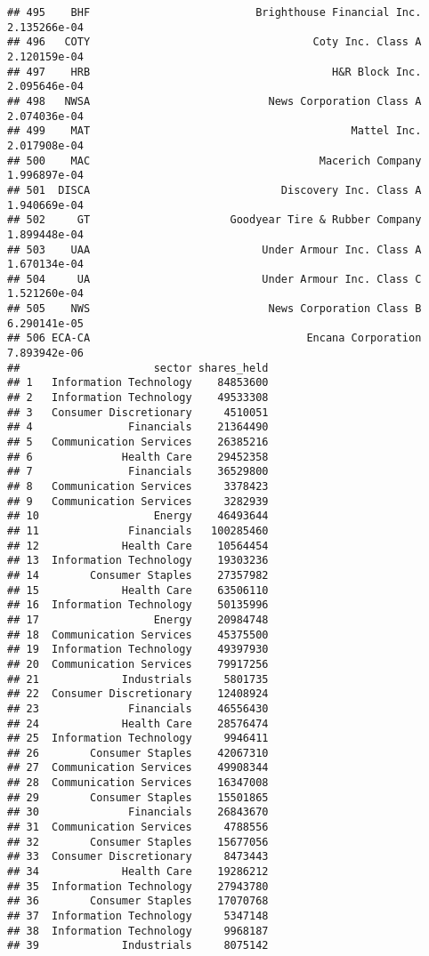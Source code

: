 \documentclass[
]{article}
\begin{document}
\begin{verbatim}
## 495    BHF                          Brighthouse Financial Inc. 2.135266e-04
## 496   COTY                                   Coty Inc. Class A 2.120159e-04
## 497    HRB                                      H&R Block Inc. 2.095646e-04
## 498   NWSA                            News Corporation Class A 2.074036e-04
## 499    MAT                                         Mattel Inc. 2.017908e-04
## 500    MAC                                    Macerich Company 1.996897e-04
## 501  DISCA                              Discovery Inc. Class A 1.940669e-04
## 502     GT                      Goodyear Tire & Rubber Company 1.899448e-04
## 503    UAA                           Under Armour Inc. Class A 1.670134e-04
## 504     UA                           Under Armour Inc. Class C 1.521260e-04
## 505    NWS                            News Corporation Class B 6.290141e-05
## 506 ECA-CA                                  Encana Corporation 7.893942e-06
##                     sector shares_held
## 1   Information Technology    84853600
## 2   Information Technology    49533308
## 3   Consumer Discretionary     4510051
## 4               Financials    21364490
## 5   Communication Services    26385216
## 6              Health Care    29452358
## 7               Financials    36529800
## 8   Communication Services     3378423
## 9   Communication Services     3282939
## 10                  Energy    46493644
## 11              Financials   100285460
## 12             Health Care    10564454
## 13  Information Technology    19303236
## 14        Consumer Staples    27357982
## 15             Health Care    63506110
## 16  Information Technology    50135996
## 17                  Energy    20984748
## 18  Communication Services    45375500
## 19  Information Technology    49397930
## 20  Communication Services    79917256
## 21             Industrials     5801735
## 22  Consumer Discretionary    12408924
## 23              Financials    46556430
## 24             Health Care    28576474
## 25  Information Technology     9946411
## 26        Consumer Staples    42067310
## 27  Communication Services    49908344
## 28  Communication Services    16347008
## 29        Consumer Staples    15501865
## 30              Financials    26843670
## 31  Communication Services     4788556
## 32        Consumer Staples    15677056
## 33  Consumer Discretionary     8473443
## 34             Health Care    19286212
## 35  Information Technology    27943780
## 36        Consumer Staples    17070768
## 37  Information Technology     5347148
## 38  Information Technology     9968187
## 39             Industrials     8075142

\end{verbatim}
\end{document}
